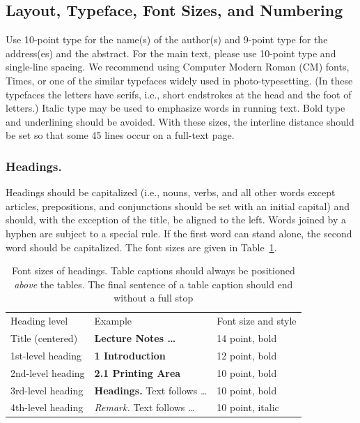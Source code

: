 \documentclass[runningheads]{llncs}
\begin{document}
\subsection{Layout, Typeface, Font Sizes, and Numbering}
Use 10-point type for the name(s) of the author(s) and 9-point type for
the address(es) and the abstract. For the main text, please use 10-point
type and single-line spacing.
We recommend using Computer Modern Roman (CM) fonts, Times, or one
of the similar typefaces widely used in photo-typesetting.
(In these typefaces the letters have serifs, i.e., short endstrokes at
the head and the foot of letters.)
Italic type may be used to emphasize words in running text. Bold
type and underlining should be avoided.
With these sizes, the interline distance should be set so that some 45
lines occur on a full-text page.

\subsubsection{Headings.}

Headings should be capitalized
(i.e., nouns, verbs, and all other words
except articles, prepositions, and conjunctions should be set with an
initial capital) and should,
with the exception of the title, be aligned to the left.
Words joined by a hyphen are subject to a special rule. If the first
word can stand alone, the second word should be capitalized.
The font sizes
are given in Table~\ref{table:headings}.
\setlength{\tabcolsep}{4pt}
\begin{table}
\begin{center}
\caption{Font sizes of headings. Table captions should always be
positioned {\it above} the tables. The final sentence of a table
caption should end without a full stop}
\label{table:headings}
\begin{tabular}{lll}
\hline\noalign{\smallskip}
Heading level & Example & Font size and style\\
\noalign{\smallskip}
\hline
\noalign{\smallskip}
Title (centered)  & {\Large \bf Lecture Notes \dots} & 14 point, bold\\
1st-level heading & {\large \bf 1 Introduction} & 12 point, bold\\
2nd-level heading & {\bf 2.1 Printing Area} & 10 point, bold\\
3rd-level heading & {\bf Headings.} Text follows \dots & 10 point, bold
\\
4th-level heading & {\it Remark.} Text follows \dots & 10 point,
italic\\
\hline
\end{tabular}
\end{center}
\end{table}
\setlength{\tabcolsep}{1.4pt}
\end{document}
